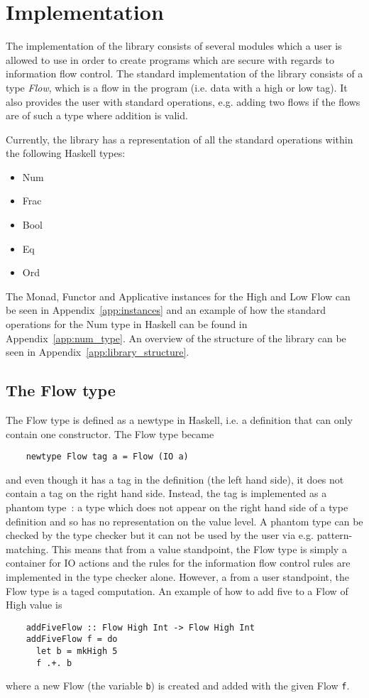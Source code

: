 \chapter{Implementation}
\label{chapter:implementation}
The implementation of the library consists of several modules which a user is allowed to use in order to create programs which are secure with regards to information flow control. The standard implementation of the library consists of a type \emph{Flow}, which is a flow in the program (i.e. data with a high or low tag). It also provides the user with standard operations, e.g. adding two flows if the flows are of such a type where addition is valid.

Currently, the library has a representation of all the standard operations within the following Haskell types:
\begin{itemize}
  \item Num
  \item Frac
  \item Bool
  \item Eq
  \item Ord
\end{itemize}

The Monad, Functor and Applicative instances for the High and Low Flow can be seen in Appendix~\ref{app:instances} and an example of how the standard operations for the Num type in Haskell can be found in Appendix~\ref{app:num_type}. An overview of the structure of the library can be seen in Appendix~\ref{app:library_structure}.
\section{The Flow type}
\label{sec:flow}
The Flow type is defined as a newtype in Haskell, i.e. a definition that can only contain one constructor. The Flow type became
\begin{verbatim}
    newtype Flow tag a = Flow (IO a)
\end{verbatim}
and even though it has a tag in the definition (the left hand side), it does not contain a tag on the right hand side. Instead, the tag is implemented as a phantom type~\cite{haskell_phantom}: a type which does not appear on the right hand side of a type definition and so has no representation on the value level. A phantom type can be checked by the type checker but it can not be used by the user via e.g. pattern-matching. This means that from a value standpoint, the Flow type is simply a container for IO actions and the rules for the information flow control rules are implemented in the type checker alone. However, a from a user standpoint, the Flow type is a taged computation. An example of how to add five to a Flow of High value is
\begin{verbatim}
    addFiveFlow :: Flow High Int -> Flow High Int
    addFiveFlow f = do
      let b = mkHigh 5
      f .+. b
\end{verbatim}
where a new Flow (the variable {\tt b}) is created and added with the given Flow {\tt f}.

